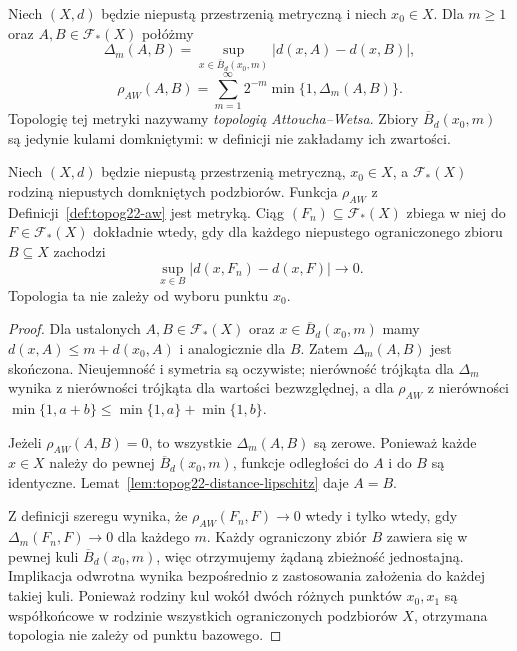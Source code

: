 \begin{definicja}
\label{def:topog22-aw}
Niech \((X,d)\) będzie niepustą przestrzenią
metryczną i niech \(x_0\in X\).
Dla \(m\ge1\) oraz \(A,B\in\mathcal F_*(X)\) połóżmy
\[
 \Delta_m(A,B)=
  \sup_{x\in\overline B_d(x_0,m)}
       |d(x,A)-d(x,B)|,
\]
\[
 \rho_{AW}(A,B)=\sum_{m=1}^{\infty}
          2^{-m}\min\{1,\Delta_m(A,B)\}.
\]
Topologię tej metryki nazywamy
\emph{topologią Attoucha--Wetsa}.
Zbiory \(\overline B_d(x_0,m)\)
są jedynie kulami domkniętymi:
w definicji nie zakładamy ich zwartości.
\end{definicja}

\begin{twierdzenie}
\label{thm:topog22-aw-metric}
Niech \((X,d)\) będzie niepustą przestrzenią metryczną,
\(x_0\in X\), a \(\mathcal F_*(X)\) rodziną
niepustych domkniętych podzbiorów.
Funkcja \(\rho_{AW}\) z Definicji~\ref{def:topog22-aw}
jest metryką. Ciąg \((F_n)\subseteq\mathcal F_*(X)\)
zbiega w niej do \(F\in\mathcal F_*(X)\)
dokładnie wtedy, gdy dla każdego niepustego ograniczonego
zbioru \(B\subseteq X\) zachodzi
\[
 \sup_{x\in B}|d(x,F_n)-d(x,F)|\longrightarrow0.
\]
Topologia ta nie zależy od wyboru punktu \(x_0\).
\end{twierdzenie}
\begin{proof}
Dla ustalonych \(A,B\in\mathcal F_*(X)\)
oraz \(x\in\overline B_d(x_0,m)\) mamy
\(d(x,A)\le m+d(x_0,A)\) i analogicznie dla \(B\).
Zatem \(\Delta_m(A,B)\) jest skończona.
Nieujemność i symetria są oczywiste;
nierówność trójkąta dla \(\Delta_m\) wynika
z nierówności trójkąta dla wartości bezwzględnej,
a dla \(\rho_{AW}\) z nierówności
\(\min\{1,a+b\}\le\min\{1,a\}+\min\{1,b\}\).

Jeżeli \(\rho_{AW}(A,B)=0\), to wszystkie
\(\Delta_m(A,B)\) są zerowe.
Ponieważ każde \(x\in X\) należy do pewnej
\(\overline B_d(x_0,m)\), funkcje odległości
do \(A\) i do \(B\) są identyczne.
Lemat~\ref{lem:topog22-distance-lipschitz}
daje \(A=B\).

Z definicji szeregu wynika, że
\(\rho_{AW}(F_n,F)\to0\) wtedy i tylko wtedy,
gdy \(\Delta_m(F_n,F)\to0\) dla każdego \(m\).
Każdy ograniczony zbiór \(B\) zawiera się
w pewnej kuli \(\overline B_d(x_0,m)\),
więc otrzymujemy żądaną zbieżność jednostajną.
Implikacja odwrotna wynika bezpośrednio
z zastosowania założenia do każdej takiej kuli.
Ponieważ rodziny kul wokół dwóch różnych
punktów \(x_0,x_1\) są współkońcowe
w rodzinie wszystkich ograniczonych podzbiorów \(X\),
otrzymana topologia nie zależy od punktu bazowego.
\end{proof}


